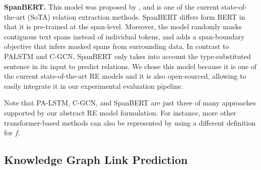 \textbf{SpanBERT.} 
This model was proposed by \citet{spanbert}, and is one of the current state-of-the-art (SoTA) relation extraction methods.
SpanBERT differs form BERT in that it is pre-trained at the span-level.
Moreover, the model randomly masks contiguous text spans instead of individual tokens, and adds a span-boundary objective that infers masked spans from surrounding data.
In contrast to PALSTM and C-GCN, SpanBERT only takes into account the type-substituted sentence in its input to predict relations.
We chose this model because it is one of the current state-of-the-art RE models and it is also open-sourced, allowing to easily integrate it in our experimental evaluation pipeline.

Note that PA-LSTM, C-GCN, and SpanBERT are just three of many approaches supported by our abstract RE model formulation.
For instance, more other transformer-based methods \citep{tre,bert-em,knowbert} can also be represented by using a different definition for $f$.

\subsection{Knowledge Graph Link Prediction}
\label{sec:kglp-task}

